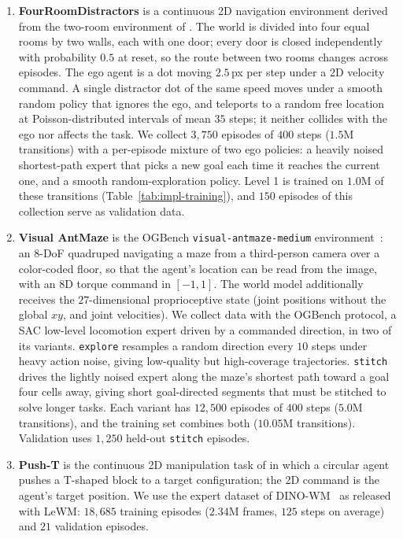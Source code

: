 \begin{enumerate}[label=\alph*)]
\item \textbf{FourRoomDistractors} is a continuous 2D navigation environment derived
from the two-room environment of \citet{sobal2025pldm}. The world is divided into four
equal rooms by two walls, each with one door; every door is closed independently with
probability $0.5$ at reset, so the route between two rooms changes across episodes.
The ego agent is a dot moving $2.5$\,px per step under a 2D velocity command. A single
distractor dot of the same speed moves under a smooth random policy that ignores the
ego, and teleports to a random free location at Poisson-distributed
intervals of mean $35$ steps; it neither collides with the ego nor affects the task.
We collect $3{,}750$ episodes of $400$ steps ($1.5$M transitions) with a per-episode
mixture of two ego policies: a heavily noised shortest-path expert that picks a new
goal each time it reaches the current one, and a smooth random-exploration policy.
Level 1 is trained on $1.0$M of these transitions (Table~\ref{tab:impl-training}), and
$150$ episodes of this collection serve as validation data.

\item \textbf{Visual AntMaze} is the OGBench \texttt{visual-antmaze-medium}
environment~\citep{park2025ogbench}: an 8-DoF quadruped navigating a maze from a
third-person camera over a color-coded floor, so that the agent's location can be read
from the image, with an 8D torque command in $[-1,1]$. The world model additionally
receives the $27$-dimensional proprioceptive state (joint positions without the global
$xy$, and joint velocities). We collect data with the OGBench protocol, a SAC
low-level locomotion expert driven by a commanded direction, in two of its variants.
\texttt{explore} resamples a random direction every $10$ steps under heavy action
noise, giving low-quality but high-coverage trajectories. \texttt{stitch} drives the
lightly noised expert along the maze's shortest path toward a goal four cells away, giving
short goal-directed segments that must be stitched to solve longer tasks. Each variant has
$12{,}500$ episodes of $400$ steps ($5.0$M transitions), and the training set combines both
($10.05$M transitions). Validation uses $1{,}250$ held-out \texttt{stitch} episodes.

\item \textbf{Push-T} is the continuous 2D manipulation task of
\citet{chi2023diffusionpolicy} in which a circular agent pushes a T-shaped block to a
target configuration; the 2D command is the agent's target position. We use the expert
dataset of DINO-WM~\citep{zhou2025dinowm} as released with LeWM: $18{,}685$ training
episodes ($2.34$M frames, $125$ steps on average) and $21$ validation episodes.


\end{enumerate}
